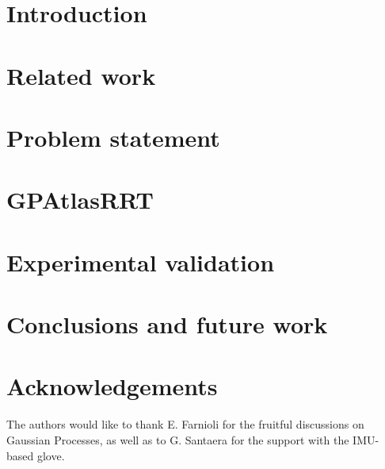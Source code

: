 \documentclass{ws-ijhr}
\begin{document}
\section{Introduction}
\label{sec:intro}



\section{Related work}
\label{sec:related}



\section{Problem statement}
\label{sec:scope}



\section{GPAtlasRRT}
\label{sec:solution}



\section{Experimental validation}
\label{sec:experiments}



\section{Conclusions and future work}
\label{sec:conclusions}



\section*{Acknowledgements}
The authors would like to thank E. Farnioli for the fruitful discussions on Gaussian Processes, as well as to G. Santaera for the support with the IMU-based glove.
\end{document}
